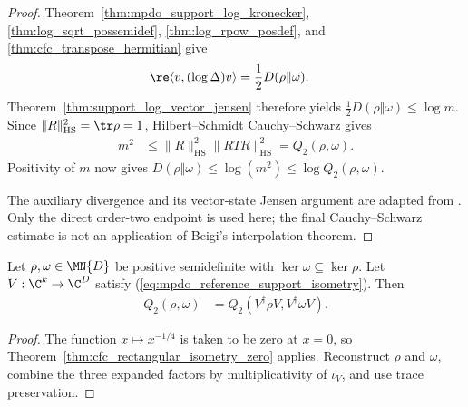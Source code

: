 \begin{proof}
    Theorem~\ref{thm:mpdo_support_log_kronecker},
    \ref{thm:log_sqrt_possemidef}, \ref{thm:log_rpow_posdef}, and
    \ref{thm:cfc_transpose_hermitian} give
    \begin{align}
        \re\langle v,(\log\Delta)v\rangle
         & =\frac12 D(\rho\Vert\omega).
        \label{eq:mpdo_relative_modular_log_moment}
    \end{align}
    Theorem~\ref{thm:support_log_vector_jensen} therefore yields
    $\frac12D(\rho\Vert\omega)\leq\log m$. Since
    $\|R\|_{\mathrm{HS}}^2=\tr\rho=1$, Hilbert--Schmidt
    Cauchy--Schwarz gives
    \begin{align}
        m^2
         & \leq\|R\|_{\mathrm{HS}}^2\|RTR\|_{\mathrm{HS}}^2
        =Q_2(\rho,\omega).
        \label{eq:mpdo_relative_modular_cauchy_schwarz}
    \end{align}
    Positivity of $m$ now gives
    $D(\rho\Vert\omega)\leq\log(m^2)\leq\log Q_2(\rho,\omega)$.

    The auxiliary divergence and its vector-state Jensen argument are adapted
    from \cite[arXiv:1306.3142v4, Definition~5 and Lemma~19, used in the proof
        of Theorem~7]{MullerLennert2013Renyi}.  Only the direct order-two endpoint
    is used here; the final Cauchy--Schwarz estimate is not an application of
    Beigi's interpolation theorem.
\end{proof}

\begin{theorem}
    \label{thm:sandwiched_renyi_two_support_compression}
    \leanok
    Let $\rho,\omega\in\MN{D}$ be positive semidefinite with
    $\ker\omega\subseteq\ker\rho$. Let $V:\C^k\to\C^D$ satisfy
    (\ref{eq:mpdo_reference_support_isometry}). Then
    \begin{align}
        Q_2(\rho,\omega)
         & =Q_2(V^\dagger\rho V,V^\dagger\omega V).
        \label{eq:mpdo_sandwiched_two_support_compression}
    \end{align}
\end{theorem}

\begin{proof}\leanok
    The function $x\mapsto x^{-1/4}$ is taken to be zero at $x=0$, so
    Theorem~\ref{thm:cfc_rectangular_isometry_zero} applies. Reconstruct
    $\rho$ and $\omega$, combine the three expanded factors by
    multiplicativity of $\iota_V$, and use trace preservation.
\end{proof}

